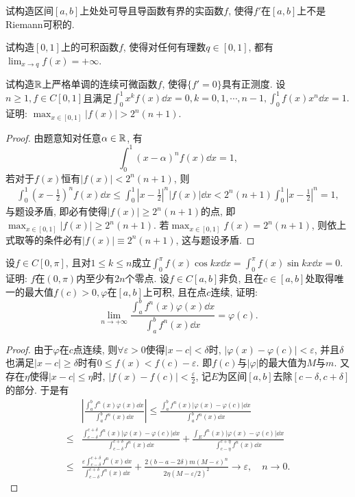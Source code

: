 \begin{quizb}
\woe 试构造区间\([a,b]\)上处处可导且导函数有界的实函数\(f\), 使得\(f'\)在\([a,b]\)上不是Riemann可积的.
\begin{solution}
    
\end{solution}
\woe 试构造\([0,1]\)上的可积函数\(f\), 使得对任何有理数\(q\in[0,1]\), 都有\(\lim_{x\rightarrow q}f(x)=+\infty\).
\begin{solution}
    
\end{solution}
\woe 试构造\(\mathbb{R}\)上严格单调的连续可微函数\(f\), 使得\(\{f'=0\}\)具有正测度.
\woe 设\(n\geqslant 1, f\in C[0,1]\)且满足\(\int_{0}^{1}x^kf(x)\dd x=0,k=0,1,\cdots,n-1,\int_{0}^{1}f(x)x^n\dd x=1.\) 证明: \(\max_{x\in[0,1]}|f(x)|>2^n(n+1)\).
\begin{proof}
由题意知对任意\(\alpha\in\mathbb{R}\), 有\[\int_{0}^{1}\left(x-\alpha\right)^nf(x)\dd x=1,\]若对于\(f(x)\)恒有\(|f(x)|<2^n(n+1)\), 则\[\begin{split}
\int_{0}^{1}\left(x-\frac{1}{2}\right)^nf(x)\dd x\leqslant\int_{0}^{1}\left|x-\frac{1}{2}\right|^n|f(x)|\dd x<2^n(n+1)\int_{0}^{1}\left|x-\frac{1}{2}\right|^n=1,
\end{split}\]与题设矛盾, 即必有使得\(|f(x)|\geqslant 2^n(n+1)\)的点, 即\(\max_{x\in[0,1]}|f(x)|\geqslant 2^n(n+1)\). 若\(\max_{x\in[0,1]}f(x)=2^n(n+1)\), 则依上式取等的条件必有\(|f(x)|\equiv 2^n(n+1)\), 这与题设矛盾.
\end{proof}
\woe 设\(f\in C[0,\pi]\), 且对\(1\leqslant k\leqslant n\)成立\(\int_{0}^{\pi}f(x)\cos kx\dd x=\int_{0}^{\pi}f(x)\sin kx\dd x=0\). 证明: \(f\)在\((0,\pi)\)内至少有\(2n\)个零点.
\woe 设\(f\in C[a,b]\)非负, 且在\(c\in[a,b]\)处取得唯一的最大值\(f(c)>0,\varphi\)在\([a,b]\)上可积, 且在点\(c\)连续, 证明: \[\lim_{n\rightarrow+\infty}\frac{\displaystyle\int_{a}^{b}f^n(x)\varphi(x)\dd x}{\displaystyle\int_{a}^{b}f^n(x)\dd x}=\varphi(c).\]
\begin{proof}
由于\(\varphi\)在\(c\)点连续, 则\(\forall \varepsilon>0\)使得\(|x-c|<\delta\)时, \(|\varphi(x)-\varphi(c)|<\varepsilon\), 并且\(\delta\)也满足\(|x-c|\geqslant\delta\)时有\(0\leqslant f(x)<f(c)-\varepsilon\). 即\(f(c)\)与\(|\varphi|\)的最大值为\(M\)与\(m\). 又存在\(\eta\)使得\(|x-c|\leqslant\eta\)时, \(|f(x)-f(c)|<\frac{\varepsilon}{2}\), 记\(E\)为区间\([a,b]\)去除\([c-\delta,c+\delta]\)的部分. 于是有\[\begin{split}
&\left|\frac{\displaystyle\int_{a}^{b}f^n(x)\varphi(x)\dd x}{\displaystyle\int_{a}^{b}f^n(x)\dd x}\right|\leqslant\frac{\displaystyle\int_{a}^{b}f^n(x)|\varphi(x)-\varphi(c)|\dd x}{\displaystyle\int_{a}^{b}f^n(x)\dd x}\\\leqslant&\frac{\displaystyle\int_{c-\delta}^{c+\delta}f^n(x)|\varphi(x)-\varphi(c)|\dd x}{\displaystyle\int_{c-\delta}^{c+\delta}f^n(x)\dd x}+\frac{\displaystyle\int_{E}f^n(x)|\varphi(x)-\varphi(c)|\dd x}{\displaystyle\int_{c-\eta}^{c+\eta}f^n(x)\dd x}\\\leqslant&\frac{\varepsilon\displaystyle\int_{c-\delta}^{c+\delta}f^n(x)\dd x}{\displaystyle\int_{c-\delta}^{c+\delta}f^n(x)\dd x}+\frac{2(b-a-2\delta)m(M-\varepsilon)^n}{2\eta(M-\varepsilon/2)^2}\rightarrow \varepsilon,\quad n\rightarrow 0.

\end{split}\]
\end{proof}
\end{quizb}
